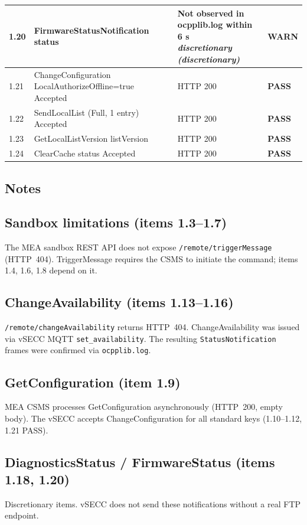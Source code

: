 \documentclass[10pt, a4paper]{article}
\begin{document}
\begin{longtable}{|L{1cm}|L{5.5cm}|M{7cm}|C{1.8cm}|}
\hline
\small 1.20 & \small FirmwareStatusNotification  status & Not observed in ocpplib.log within 6 s{\newline\normalfont\footnotesize\itshape *discretionary (discretionary)} & \textcolor{warnorange}{\textbf{WARN}} \\
\hline
\small 1.21 & \small ChangeConfiguration LocalAuthorizeOffline=true  Accepted & HTTP 200 & \textcolor{passgreen}{\textbf{PASS}} \\
\hline
\small 1.22 & \small SendLocalList (Full, 1 entry)  Accepted & HTTP 200 & \textcolor{passgreen}{\textbf{PASS}} \\
\hline
\small 1.23 & \small GetLocalListVersion  listVersion & HTTP 200 & \textcolor{passgreen}{\textbf{PASS}} \\
\hline
\small 1.24 & \small ClearCache  status Accepted & HTTP 200 & \textcolor{passgreen}{\textbf{PASS}} \\
\hline
\end{longtable}
\normalsize
\subsection*{Notes}

\subsection*{Sandbox limitations (items 1.3--1.7)}
The MEA sandbox REST API does not expose \texttt{/remote/triggerMessage} (HTTP~404).
TriggerMessage requires the CSMS to initiate the command; items 1.4, 1.6, 1.8 depend on it.

\subsection*{ChangeAvailability (items 1.13--1.16)}
\texttt{/remote/changeAvailability} returns HTTP~404.
ChangeAvailability was issued via vSECC MQTT \texttt{set\_availability}.
The resulting \texttt{StatusNotification} frames were confirmed via \texttt{ocpplib.log}.

\subsection*{GetConfiguration (item 1.9)}
MEA CSMS processes GetConfiguration asynchronously (HTTP~200, empty body).
The vSECC accepts ChangeConfiguration for all standard keys (1.10--1.12, 1.21 PASS).

\subsection*{DiagnosticsStatus / FirmwareStatus (items 1.18, 1.20)}
Discretionary items. vSECC does not send these notifications without a real FTP endpoint.
\end{document}
